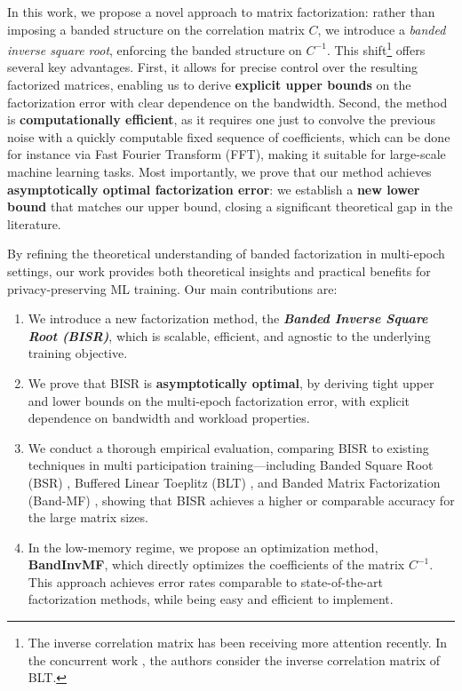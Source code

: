 \documentclass{article} %
\newcommand{\acronym}{BISR\xspace}
\begin{document}
In this work, we propose a novel approach to matrix factorization: rather than imposing a banded structure on the correlation matrix $C$, we introduce a \textit{banded inverse square root}, enforcing the banded structure on $C^{-1}$. This shift\footnote{The inverse correlation matrix has been receiving more attention recently. In the concurrent work \citet{mcmahan2025inversion}, the authors consider the inverse correlation matrix of BLT.} offers several key advantages. First, it allows for precise control over the resulting factorized matrices, enabling us to derive \textbf{explicit upper bounds} on the factorization error with clear dependence on the bandwidth. Second, the method is \textbf{computationally efficient}, as it requires one just to convolve the previous noise with a quickly computable fixed sequence of coefficients, which can be done for instance via Fast Fourier Transform (FFT), making it suitable for large-scale machine learning tasks. Most importantly, we prove that our method achieves \textbf{asymptotically optimal factorization error}: we establish a \textbf{new lower bound} that matches our upper bound, closing a significant theoretical gap in the literature.

By refining the theoretical understanding of banded factorization in multi-epoch settings, our work provides both theoretical insights and practical benefits for privacy-preserving ML training.
Our main contributions are: \begin{enumerate}[leftmargin=5mm,parsep=0pt]
\item We introduce a new factorization method, the \textbf{\emph{Banded Inverse Square Root (\acronym)}}, which is scalable, efficient, and agnostic to the underlying training objective. 
\item We prove that \acronym is \textbf{asymptotically optimal}, by deriving tight upper and lower bounds on the multi-epoch factorization error, with explicit dependence on bandwidth and workload properties. \item We conduct a thorough empirical evaluation, comparing \acronym to existing techniques in multi participation training—including Banded Square Root (BSR) \citep{kalinin2024}, Buffered Linear Toeplitz (BLT) \citep{dvijotham2024efficient}, and Banded Matrix Factorization (Band-MF) \citep{scalingmckenna2024}, showing that \acronym achieves a higher or comparable accuracy for the large matrix sizes.
\item In the low-memory regime, we propose an optimization method, \textbf{BandInvMF}, which directly optimizes the coefficients of the matrix $C^{-1}$. This approach achieves error rates comparable to state-of-the-art factorization methods, while being easy and efficient to implement. 
\end{enumerate}
\end{document}

